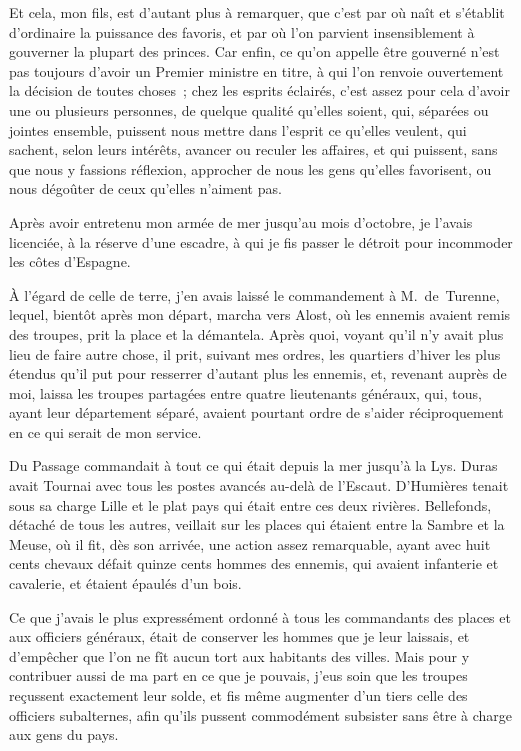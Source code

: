 \documentclass[french,twoside]{book} %
\begin{document}
Et cela, mon fils, est d’autant plus à remarquer, que c’est par où naît et s’établit d’ordinaire la puissance des favoris, et par où l’on parvient insensiblement à gouverner la plupart des princes. Car enfin, ce qu’on appelle être gouverné n’est pas toujours d’avoir un Premier ministre en titre, à qui l’on renvoie ouvertement la décision de toutes choses ; chez les esprits éclairés, c’est assez pour cela d’avoir une ou plusieurs personnes, de quelque qualité qu’elles soient, qui, séparées ou jointes ensemble, puissent nous mettre dans l’esprit ce qu’elles veulent, qui sachent, selon leurs intérêts, avancer ou reculer les affaires, et qui puissent, sans que nous y fassions réflexion, approcher de nous les gens qu’elles favorisent, ou nous dégoûter de ceux qu’elles n’aiment pas.\par
Après avoir entretenu mon armée de mer jusqu’au mois d’octobre, je l’avais licenciée, à la réserve d’une escadre, à qui je fis passer le détroit pour incommoder les côtes d’Espagne.\par
À l’égard de celle de terre, j’en avais laissé le commandement à M. de Turenne, lequel, bientôt après mon départ, marcha vers Alost, où les ennemis avaient remis des troupes, prit la place et la démantela. Après quoi, voyant qu’il n’y avait plus lieu de faire autre chose, il prit, suivant mes ordres, les quartiers d’hiver les plus étendus qu’il put pour resserrer d’autant plus les ennemis, et, revenant auprès de moi, laissa les troupes partagées entre quatre lieutenants généraux, qui, tous, ayant leur département séparé, avaient pourtant ordre de s’aider réciproquement en ce qui serait de mon service.\par
Du Passage commandait à tout ce qui était depuis la mer jusqu’à la Lys. Duras avait Tournai avec tous les postes avancés au-delà de l’Escaut. D’Humières tenait sous sa charge Lille et le plat pays qui était entre ces deux rivières. Bellefonds, détaché de tous les autres, veillait sur les places qui étaient entre la Sambre et la Meuse, où il fit, dès son arrivée, une action assez remarquable, ayant avec huit cents chevaux défait quinze cents hommes des ennemis, qui avaient infanterie et cavalerie, et étaient épaulés d’un bois.\par
Ce que j’avais le plus expressément ordonné à tous les commandants des places et aux officiers généraux, était de conserver les hommes que je leur laissais, et d’empêcher que l’on ne fît aucun tort aux habitants des villes. Mais pour y contribuer aussi de ma part en ce que je pouvais, j’eus soin que les troupes reçussent exactement leur solde, et fis même augmenter d’un tiers celle des officiers subalternes, afin qu’ils pussent commodément subsister sans être à charge aux gens du pays.\par
\end{document}
